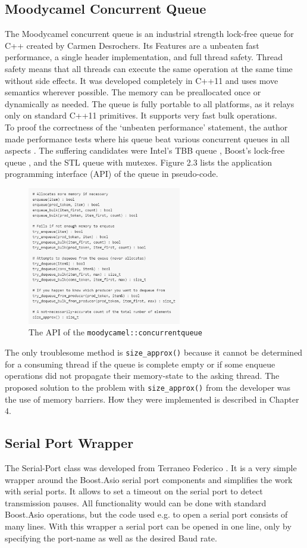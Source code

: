 \subsection{Moodycamel Concurrent Queue}
The Moodycamel concurrent queue is an industrial strength lock-free queue for C++ created by Carmen Desrochers. Its Features are a unbeaten fast performance, a single header implementation, and full thread safety. Thread safety means that all threads can execute the same operation at the same time without side effects. It was developed completely in C++11 and uses move semantics wherever possible. The memory can be preallocated once or dynamically as needed. The queue is fully portable to all platforms, as it relays only on standard C++11 primitives. It supports very fast bulk operations. \cite{moody}\\
To proof the correctness of the `unbeaten performance' statement, the author made performance tests where his queue beat various concurrent queues in all aspects \cite{benchmark}. The suffering candidates were Intel's TBB queue \cite{intel_tbb}, Boost's lock-free queue \cite{boost_lockfree}, and the STL queue \cite{std_queue} with mutexes. Figure 2.3 lists the application programming interface (API) of the queue in pseudo-code.
\begin{figure}[h]
\centering
      \includegraphics[width=0.6\textwidth]{moody}
        \caption{The API of the \texttt{moodycamel::concurrentqueue}}
\end{figure}
The only troublesome method is \texttt{size\_approx()} because it cannot be determined for a consuming thread if the queue is complete empty or if some enqueue operations did not propagate their memory-state to the asking thread. The proposed solution to the problem with \texttt{size\_approx()} from the developer was the use of memory barriers. How they were implemented is described in Chapter 4.
\subsection{Serial Port Wrapper}
The Serial-Port class was developed from Terraneo Federico \cite{serport}. It is a very simple wrapper around the Boost.Asio serial port components and simplifies the work with serial ports. It allows to set a timeout on the serial port to detect transmission pauses. All functionality would can be done with standard Boost.Asio operations, but the code used e.g. to open a serial port consists of many lines. With this wrapper a serial port can be opened in one line, only by specifying the port-name  as well as the desired Baud rate.